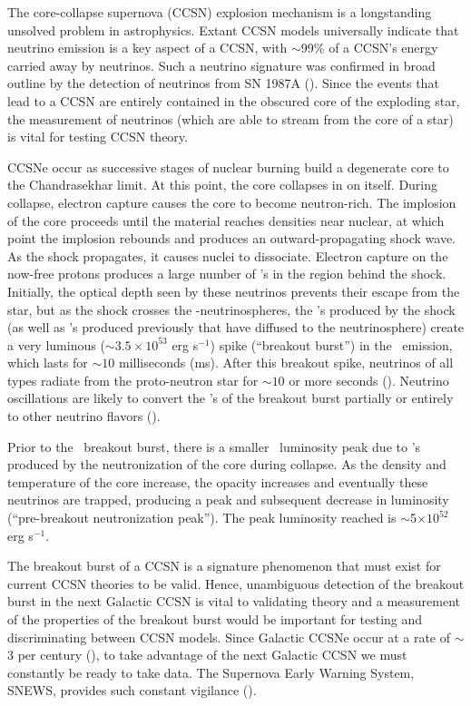 The core-collapse supernova (CCSN) explosion mechanism is a
longstanding unsolved problem in astrophysics. Extant CCSN models
universally indicate that neutrino emission is a key aspect
of a CCSN, with $\sim$99\% of a CCSN's energy carried away by
neutrinos. Such a neutrino signature was confirmed in broad outline 
by the detection of 
neutrinos from SN 1987A (\citealp{bionta1987,hirata1987}).  
Since the events that lead to a CCSN 
are entirely contained 
in the obscured core of the exploding star, the measurement of neutrinos 
(which are able to stream from the core of a star) is vital for testing CCSN theory.  

CCSNe occur as successive stages of nuclear burning build a
degenerate core to the Chandrasekhar limit. At this point, the 
core collapses in on
itself.  During collapse, electron capture causes the core to become neutron-rich.
  The implosion of the core proceeds until the material reaches
densities near nuclear, at which point the implosion
rebounds and produces an outward-propagating shock wave. 
  As the shock propagates, it causes nuclei to dissociate.
Electron capture on the now-free protons produces a large
number of \nue's in the region behind the shock. Initially, the optical
depth seen by these neutrinos prevents their escape from the star, 
but as the shock crosses the \nue-neutrinospheres, the
\nue's produced by the shock (as well as \nue's produced previously 
that have diffused to the neutrinosphere) create a very
luminous (${\sim} 3.5 \times 10^{53}$ erg s$^{-1}$) spike (``breakout
burst'') in the
\nue\ emission, which lasts for ${\sim}10$ milliseconds (ms).  After
this breakout spike,
neutrinos of all types radiate from the proto-neutron
star for ${\sim}10$ or more seconds 
(\citealt{burrowslattimer1986}).  Neutrino oscillations are likely to convert
the \nue's of the breakout burst partially or entirely to other
neutrino flavors (\citealt{mirizzietal2015}).


Prior to the \nue\ breakout burst, 
there is a smaller \nue\ luminosity peak
due to \nue's produced by the neutronization of the core during
 collapse. As the density and temperature of the core increase, the
 opacity increases and eventually these neutrinos are trapped,
 producing a peak and subsequent decrease in luminosity
 (``pre-breakout neutronization peak'').  The peak
 luminosity reached is $\sim$5$\times 10^{52}$ erg s$^{-1}$. 

The breakout burst of a CCSN is a signature
phenomenon that must exist for current CCSN theories to be 
valid. Hence, unambiguous detection of the breakout burst 
in the next Galactic 
CCSN is vital to validating theory and a measurement of 
the properties of the breakout burst
would be important for testing and discriminating between CCSN models. Since 
Galactic CCSNe occur at a rate of $\sim$3 per century 
(\citealt{adamsetal2013}),  to take advantage of the next
Galactic CCSN we must constantly be ready to
take data.  The Supernova Early Warning System, SNEWS, provides such
constant vigilance
 (\citealp{antoniolietal2004,scholberg2008}).

